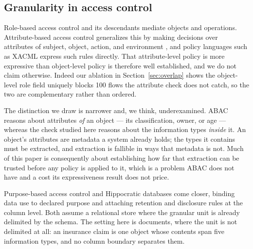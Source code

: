 \documentclass[conference]{IEEEtran}
\begin{document}
\subsection{Granularity in access control}
Role-based access control \cite{b3} and its descendants mediate objects and
operations. Attribute-based access control generalizes this by making decisions
over attributes of subject, object, action, and environment
\cite{b20}, and policy languages such as XACML \cite{b21} express such
rules directly. That attribute-level policy is more expressive than object-level
policy is therefore well established, and we do not claim otherwise. Indeed our
ablation in Section~\ref{sec:overlap} shows the object-level role field uniquely
blocks 100 flows the attribute check does not catch, so the two are
complementary rather than ordered.

The distinction we draw is narrower and, we think, underexamined. ABAC reasons
about attributes \emph{of} an object --- its classification, owner, or age ---
whereas the check studied here reasons about the information types \emph{inside}
it. An object's attributes are metadata a system already holds; the types it
contains must be extracted, and extraction is fallible in ways that metadata is
not. Much of this paper is consequently about establishing how far that
extraction can be trusted before any policy is applied to it, which is a problem
ABAC does not have and a cost its expressiveness result does not price.

Purpose-based access control \cite{b22} and Hippocratic databases
\cite{b23} come closer, binding data use to declared purpose and
attaching retention and disclosure rules at the column level. Both assume a
relational store where the granular unit is already delimited by the schema. The
setting here is documents, where the unit is not delimited at all: an insurance
claim is one object whose contents span five information types, and no column
boundary separates them.
\end{document}
